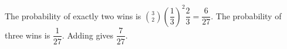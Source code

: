 The probability of exactly two wins is $\binom32\left(\dfrac{1}{3}\right)^2\dfrac{2}{3}=\dfrac{6}{27}$. The probability of three wins is $\dfrac{1}{27}$. Adding gives $\boxed{\dfrac{7}{27}}$.
